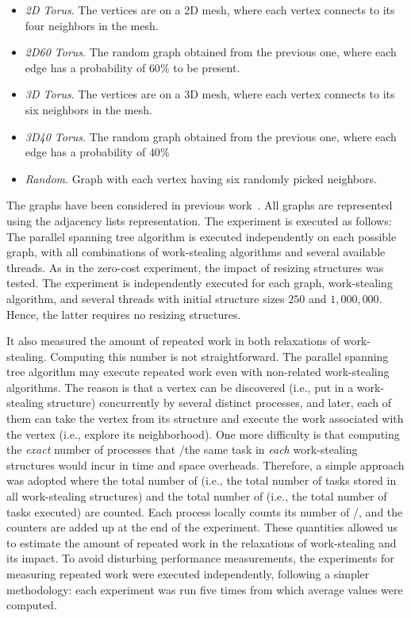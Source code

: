 \begin{itemize}
    \item \textit{2D Torus}. The vertices are on a 2D mesh, where each vertex connects to its four neighbors in the mesh.
    \item \textit{2D60 Torus}. The random graph obtained from the previous one, where each edge has a probability of $60\%$
to be present.
    \item \textit{3D Torus}. The vertices are on a 3D mesh, where each vertex connects to its six neighbors in the mesh.
    \item \textit{3D40 Torus}. The random graph obtained from the previous one, where each edge has a probability of $40\%$
    \item \textit{Random}. Graph with each vertex having six randomly picked neighbors.
\end{itemize}


The graphs have been considered in previous work~\cite{1302951, maged.vechev.2009, fencefreework}.  All graphs are represented using the adjacency lists representation. The experiment is executed as follows: The parallel spanning tree algorithm is executed independently on each possible graph, with all combinations of work-stealing algorithms and several available threads.  As in the zero-cost experiment, the impact of resizing structures was tested. The experiment is independently executed for each graph, work-stealing algorithm, and several threads with initial structure sizes $250$ and $1,000,000$. Hence, the latter requires no resizing structures.

It also measured the amount of repeated work in both relaxations of work-stealing.  Computing this number is not straightforward.  The parallel spanning tree algorithm may execute repeated work even with non-related work-stealing algorithms. The reason is that a vertex can be discovered (i.e., put in a work-stealing structure) concurrently by several distinct processes, and later, each of them can take the vertex from its structure and execute the work associated with the vertex (i.e., explore its neighborhood).  One more difficulty is that computing the \emph{exact} number of processes that \Take/\Steal the same task in \emph{each} work-stealing structures would incur in time and space overheads.  Therefore, a simple approach was adopted where the total number of \Puts (i.e., the total number of tasks stored in all work-stealing structures) and the total number of \Takes (i.e., the total number of tasks executed) are counted.  Each process locally counts its number of \Puts/\Takes, and the counters are added up at the end of the experiment.  These quantities allowed us to estimate the amount of repeated work in the relaxations of work-stealing and its impact.  To avoid disturbing performance measurements, the experiments for measuring repeated work were executed independently, following a simpler methodology: each experiment was run five times from which average values were computed.

